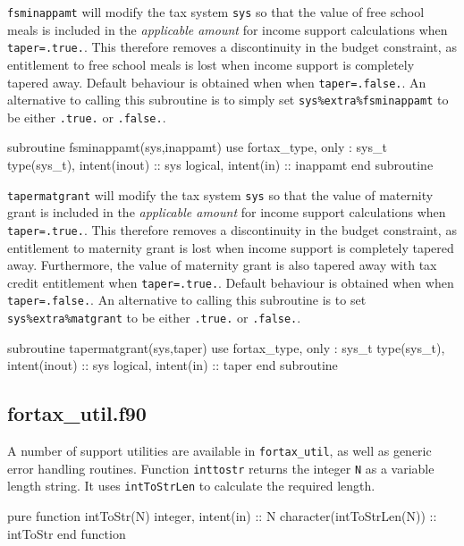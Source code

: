 \documentclass[11pt,thmsa,letter,ukenglish]{article}
\begin{document}
\noindent\texttt{fsminappamt} will modify the tax system \texttt{sys} so that the value of free school meals is included in the \emph{applicable amount} for income support calculations when \texttt{taper=.true.}. This therefore removes a discontinuity in the budget constraint, as entitlement to free school meals is lost when income support is completely tapered away. Default behaviour is obtained when when \texttt{taper=.false.}. An alternative to calling this subroutine is to simply set \texttt{sys\%extra\%fsminappamt} to be either \texttt{.true.} or \texttt{.false.}.

\begin{fortrancode}
subroutine fsminappamt(sys,inappamt)
    use fortax_type, only : sys_t
    type(sys_t), intent(inout) :: sys
    logical,     intent(in)    :: inappamt
end subroutine        
\end{fortrancode}

\noindent\texttt{tapermatgrant} will modify the tax system \texttt{sys} so that the value of maternity grant is included in the \emph{applicable amount} for income support calculations when \texttt{taper=.true.}. This therefore removes a discontinuity in the budget constraint, as entitlement to maternity grant is lost when income support is completely tapered away. Furthermore, the value of maternity grant is also tapered away with tax credit entitlement when \texttt{taper=.true.}. Default behaviour is obtained when when \texttt{taper=.false.}. An alternative to calling this subroutine is to set \texttt{sys\%extra\%matgrant} to be either \texttt{.true.} or \texttt{.false.}.

\begin{fortrancode}
subroutine tapermatgrant(sys,taper)
    use fortax_type, only : sys_t
    type(sys_t), intent(inout) :: sys
    logical,     intent(in)    :: taper
end subroutine
\end{fortrancode}
            
\subsection{fortax\_util.f90}\label{sec:fortaxutil}

A number of support utilities are available in \texttt{fortax\_util}, as well as generic error handling routines. Function \texttt{inttostr} returns the integer \texttt{N} as a variable length string. It uses \texttt{intToStrLen} to calculate the required length.
\begin{fortrancode}
pure function intToStr(N)
    integer, intent(in)       :: N
    character(intToStrLen(N)) :: intToStr
end function
\end{fortrancode}
\end{document}
